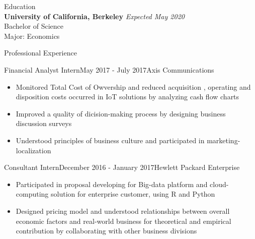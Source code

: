 \documentclass{resume}
\begin{document}
\begin{rSection}{Education}
\\{\bf University of California, Berkeley} \hfill {\em Expected May 2020} 
\\ Bachelor of Science 
\\ Major: Economics


\end{rSection}


\begin{rSection}{Professional Experience}

\begin{rSubsection}{Financial Analyst Intern}{May 2017 - July 2017}{Axis Communications}{}
\begin{itemize}
\item Monitored Total Cost of Owvership and reduced acquisition , operating and disposition costs occurred in IoT solutions by analyzing cash flow charts
\item Improved a quality of dicision-making process by designing business discussion surveys
\item Understood principles of business culture and participated in marketing-localization
\end{itemize}
\end{rSubsection}

\begin{rSubsection}{Consultant Intern}{December 2016 - January 2017}{Hewlett Packard Enterprise}{}
\begin{itemize}
\item Participated in proposal developing for Big-data platform and cloud-computing solution for enterprise customer, using R and Python
\item Designed pricing model and understood relationships between overall economic factors and real-world business for theoretical and empirical contribution by collaborating with other business divisions
\end{itemize}
\end{rSubsection}

\end{rSection}
\end{document}
